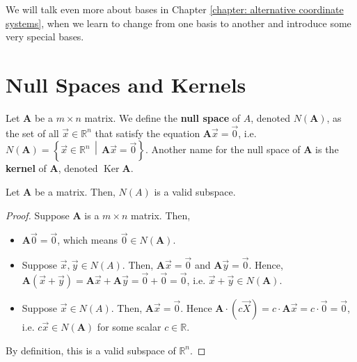 \documentclass[]{book}
\DeclareMathOperator{\kernel}{Ker}
\newcommand{\suchthat}{\,\middle|\,}
\newcommand{\mat}[1]{\ensuremath{\mathbf{#1}}}
\begin{document}
We will talk even more about bases in Chapter \ref{chapter: alternative coordinate systems}, when we learn to change from one basis to another and introduce some very special bases.

\section{Null Spaces and Kernels}
\begin{definition}
    Let $\mat{A}$ be a $m\times n$ matrix. We define the \textbf{null space} of $A$, denoted $N(\mat{A})$, as the set of all $\vec{x} \in \mathbb{R}^n$ that satisfy the equation $\mat{A}\vec{x}=\vec{0}$, i.e. $N(\mat{A})=\left\{\vec{x} \in \mathbb{R}^n \suchthat \mat{A}\vec{x}=\vec{0}\right\}$. Another name for the null space of $\mat{A}$ is the \textbf{kernel} of $\mat{A}$, denoted $\kernel\mat{A}$.
\end{definition}
\begin{theorem}
    Let $\mathbf{A}$ be a matrix. Then, $N(A)$ is a valid subspace.

\begin{proof}
    Suppose $\mathbf{A}$ is a $m \times n$ matrix. Then,
    \begin{itemize}
        \item $\mathbf{A}\vec{0} = \vec{0}$, which means $\vec{0} \in N(\mat{A})$.
        \item Suppose $\vec{x}, \vec{y} \in N(A)$. Then, $\mathbf{A}\vec{x} = \vec{0}$ and $\mathbf{A}\vec{y}=\vec{0}$. Hence, $\mathbf{A}(\vec{x} + \vec{y}) = \mathbf{A}\vec{x} + \mathbf{A}\vec{y} = \vec{0} + \vec{0} = \vec{0}$, i.e. $\vec{x} + \vec{y} \in N(\mat{A})$.
        \item Suppose $\vec{x} \in N(A)$. Then, $\mathbf{A}\vec{x} = \vec{0}$. Hence $\mathbf{A}\cdot(c\vec{X}) = c \cdot \mathbf{A}\vec{x} = c \cdot \vec{0} = \vec{0}$, i.e. $c\vec{x} \in N(\mat{A})$ for some scalar $c \in \mathbb{R}$.
    \end{itemize}

    By definition, this is a valid subspace of $\mathbb{R}^n$.
\end{proof}
\end{theorem}
\end{document}
